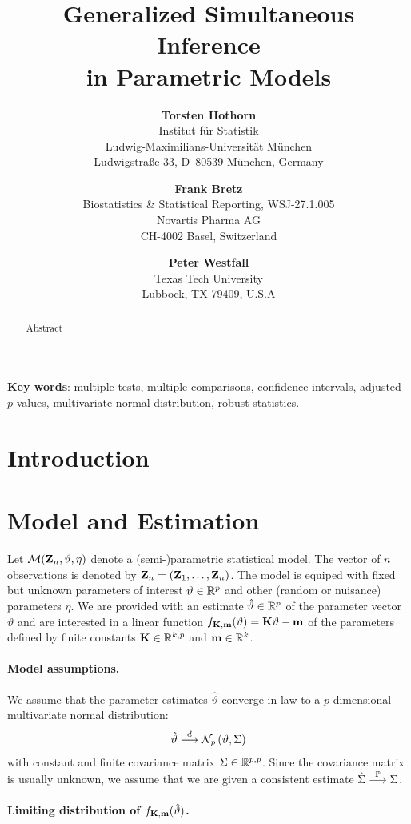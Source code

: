\documentclass[12pt]{article}
\title{Generalized Simultaneous Inference \\ in Parametric Models}
\author{\textbf{Torsten Hothorn} \\
Institut f{\"u}r Statistik \\
Ludwig-Maximilians-Universit{\"a}t M{\"u}nchen \\
Ludwigstra{\ss}e 33, D--80539 M{\"u}nchen, Germany\\
\and \textbf{Frank Bretz} \\
Biostatistics \& Statistical Reporting, WSJ-27.1.005\\
Novartis Pharma AG \\
CH-4002 Basel, Switzerland \\
\and \textbf{Peter Westfall} \\
Texas Tech University \\
Lubbock, TX 79409, U.S.A}
\begin{document}
\maketitle

\begin{abstract}
Abstract
\end{abstract}

\textbf{Key words}: multiple tests, multiple comparisons, confidence intervals,
adjusted $p$-values, multivariate normal distribution, robust statistics.

\newpage

\section{Introduction}

\section{Model and Estimation} \label{model}

Let $\mathcal{M}(\mathbf{Z}_n, \vartheta, \eta)$ denote a (semi-)parametric statistical model.
The vector of $n$ observations is denoted by $\mathbf{Z}_n = (\mathbf{Z}_1, \dots, \mathbf{Z}_n)$. 
The model is equiped with fixed
but unknown parameters of interest $\vartheta \in \mathbb{R}^p$ 
and other (random or nuisance) parameters $\eta$. We are provided 
with an estimate $\hat{\vartheta} \in \mathbb{R}^p$ of the parameter 
vector $\vartheta$ and are interested in a linear
function $f_{\mathbf{K}, \mathbf{m}}(\vartheta) = \mathbf{K} \vartheta - \mathbf{m}$
of the parameters defined by finite constants $\mathbf{K} \in \mathbb{R}^{k, p}$
and $\mathbf{m} \in \mathbb{R}^k$.

\paragraph{Model assumptions.}

We assume that the parameter estimates $\hat{\vartheta}$ converge in law
to a $p$-dimensional multivariate normal distribution:
\begin{eqnarray} \label{normality}
\hat{\vartheta} \stackrel{d}{\longrightarrow} \mathcal{N}_p\left(\vartheta, \Sigma\right)
\end{eqnarray}
with constant and finite covariance matrix $\Sigma \in \mathbb{R}^{p,p}$.
Since the covariance matrix is usually unknown, we assume 
that we are given a consistent estimate $\hat{\Sigma} \stackrel{\mathbb{P}}{\longrightarrow} \Sigma$.

\paragraph{Limiting distribution of $f_{\mathbf{K},\mathbf{m}}(\hat{\vartheta})$.}
\end{document}
